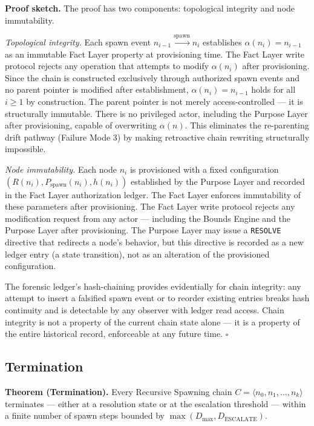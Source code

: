 \medskip
\noindent\textbf{Proof sketch.} The proof has two components: topological integrity and node immutability.

\medskip
\textit{Topological integrity.} Each spawn event $n_{i-1} \xrightarrow{\mathrm{spawn}} n_i$ establishes $\alpha(n_i) = n_{i-1}$ as an immutable Fact Layer property at provisioning time. The Fact Layer write protocol rejects any operation that attempts to modify $\alpha(n_i)$ after provisioning. Since the chain is constructed exclusively through authorized spawn events and no parent pointer is modified after establishment, $\alpha(n_i) = n_{i-1}$ holds for all $i \geq 1$ by construction. The parent pointer is not merely access-controlled — it is structurally immutable. There is no privileged actor, including the Purpose Layer after provisioning, capable of overwriting $\alpha(n)$. This eliminates the re-parenting drift pathway (Failure Mode 3) by making retroactive chain rewriting structurally impossible.

\medskip
\textit{Node immutability.} Each node $n_i$ is provisioned with a fixed configuration $(R(n_i), P_{\mathrm{spawn}}(n_i), h(n_i))$ established by the Purpose Layer and recorded in the Fact Layer authorization ledger. The Fact Layer enforces immutability of these parameters after provisioning. The Fact Layer write protocol rejects any modification request from any actor — including the Bounds Engine and the Purpose Layer after provisioning. The Purpose Layer may issue a \texttt{RESOLVE} directive that redirects a node's behavior, but this directive is recorded as a new ledger entry (a state transition), not as an alteration of the provisioned configuration.

\medskip
The forensic ledger's hash-chaining provides evidentially for chain integrity: any attempt to insert a falsified spawn event or to reorder existing entries breaks hash continuity and is detectable by any observer with ledger read access. Chain integrity is not a property of the current chain state alone — it is a property of the entire historical record, enforceable at any future time. $\square$

\subsection{Termination}
\label{sec:rs-termination-proof}

\medskip
\noindent\textbf{Theorem (Termination).} Every Recursive Spawning chain $C = \langle n_0, n_1, \ldots, n_k \rangle$ terminates — either at a resolution state or at the escalation threshold — within a finite number of spawn steps bounded by $\max(D_{\mathrm{max}}, D_{\mathrm{ESCALATE}})$.

